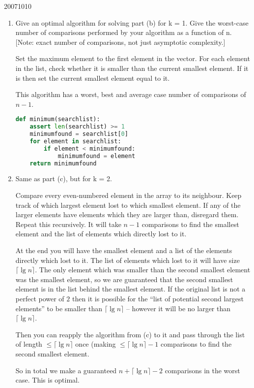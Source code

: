 \documentclass[10pt,\jkfside,a4paper]{article}
\begin{document}
\begin{examquestion}{2007}{10}{10}
\begin{enumerate}
\item Give an optimal algorithm for solving part (b) for k = 1. Give the worst-case
number of comparisons performed by your algorithm as a function of n. [Note:
exact number of comparisons, not just asymptotic complexity.]

Set the maximum element to the first element in the vector. For each element in the 
list, check whether it is smaller than the current smallest element. If it is then 
set the current smallest element equal to it. 

This algorithm has a worst, best and average case number of comparisons of $n - 1$. 

\begin{lstlisting}[language=python]
def minimum(searchlist):
	assert len(searchlist) >= 1
	minimumfound = searchlist[0]
	for element in searchlist:
		if element < minimumfound:
			minimumfound = element
	return minimumfound
\end{lstlisting}

\item Same as part (c), but for k = 2.

Compare every even-numbered element in the array to its neighbour. Keep track of which largest element 
lost to which smallest element. If any of the larger elements have elements which they are larger than, 
disregard them. 
Repeat this recursively. It will take $n - 1$ comparisons to find the smallest element and the 
list of elements which directly lost to it.

At the end you will have the smallest element and a list of the elements directly which lost to it. 
The list of elements which lost to it will have size $\lceil \lg n \rceil$. 
The only element which was smaller than the second smallest element was the smallest element, so we are 
guaranteed that the second smallest element is in the list behind the smallest element.
If the original list is not a perfect power of $2$ then it is possible for the ``list of potential 
second largest elements'' to be smaller than $\lceil \lg n\rceil$ -- however it will be no larger than 
$\lceil \lg n \rceil$.

Then you can reapply the algorithm from 
(c) to it and pass through the list of length $\leq \lceil \lg n \rceil$ once (making $\leq \lceil \lg n \rceil - 1$ 
comparisons to find the second smallest element.

So in total we make a guaranteed $n + \lceil \lg n \rceil - 2$ comparisons in the worst case. This is optimal.


\end{enumerate}
\end{examquestion}
\end{document}
